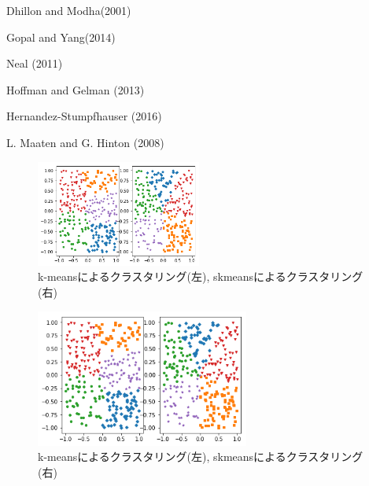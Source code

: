 \documentclass[a4j,11pt]{jarticle}
\begin{document}
Dhillon and Modha(2001) \citet{SKMcluster}

Gopal and Yang(2014) \citet{Gopal}

Neal (2011) \citet{HMC}

Hoffman and Gelman (2013) \citet{NUTS}

Hernandez-Stumpfhauser (2016) \citet{SGPN}

L. Maaten and G. Hinton (2008) \citet{tSNE}
\fi

\vspace{-0.3cm}
\begin{figure}[H]
\begin{center}
\includegraphics[clip,height= 35mm]{data/kmeans+skmeans.png}
\end{center}
 \vspace{-0.9cm}
\caption{k-meansによるクラスタリング(左), skmeansによるクラスタリング(右)}
\label{skmeans}
\end{figure}

\begin{figure}
\vspace{-0.6cm}
\centering
\includegraphics[keepaspectratio,width=70mm]{data/kmeans+skmeans.png}
\vspace{-1cm}
\caption{k-meansによるクラスタリング(左), skmeansによるクラスタリング(右)}
\label{kmeans}
\end{figure}
\end{document}
